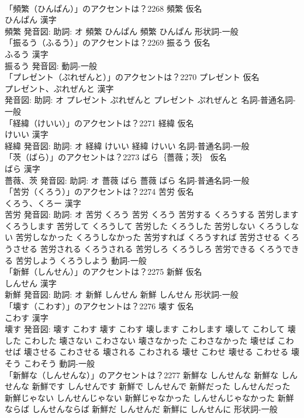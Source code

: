 \documentclass[8pt]{extreport}
\begin{document}
\begin{CJK}{UTF8}{min}
\\	「頻繁（ひんぱん）」のアクセントは？2268	頻繁 仮名　
\\	ひんぱん 漢字　
\\	頻繁 発音図: 助詞: オ	頻繁 ひんぱん		頻繁 ひんぱん				形状詞-一般 
\\	「振るう（ふるう）」のアクセントは？2269	振るう 仮名　
\\	ふるう 漢字　
\\	振るう 発音図:							動詞-一般 
\\	「プレゼント（ぷれぜんと）」のアクセントは？2270	プレゼント 仮名　
\\	プレゼント、ぷれぜんと 漢字　
\\	発音図: 助詞: オ	プレゼント ぷれぜんと		プレゼント ぷれぜんと				名詞-普通名詞-一般 
\\	「経緯（けいい）」のアクセントは？2271	経緯 仮名　
\\	けいい 漢字　
\\	経緯 発音図: 助詞: オ	経緯 けいい		経緯 けいい				名詞-普通名詞-一般 
\\	「茨（ばら）」のアクセントは？2273	ばら｛薔薇；茨｝ 仮名　
\\	ばら 漢字　
\\	薔薇、茨 発音図: 助詞: オ	薔薇 ばら		薔薇 ばら				名詞-普通名詞-一般 
\\	「苦労（くろう）」のアクセントは？2274	苦労 仮名　
\\	くろう、くろー 漢字　
\\	苦労 発音図: 助詞: オ	苦労 くろう		苦労 くろう 苦労する くろうする 苦労します くろうします 苦労して くろうして 苦労した くろうした 苦労しない くろうしない 苦労しなかった くろうしなかった 苦労すれば くろうすれば 苦労させる くろうさせる 苦労される くろうされる 苦労しろ くろうしろ 苦労できる くろうできる 苦労しよう くろうしよう				動詞-一般 
\\	「新鮮（しんせん）」のアクセントは？2275	新鮮 仮名　
\\	しんせん 漢字　
\\	新鮮 発音図: 助詞: オ	新鮮 しんせん		新鮮 しんせん				形状詞-一般 
\\	「壊す（こわす）」のアクセントは？2276	壊す 仮名　
\\	こわす 漢字　
\\	壊す 発音図:	壊す こわす		壊す こわす 壊します こわします 壊して こわして 壊した こわした 壊さない こわさない 壊さなかった こわさなかった 壊せば こわせば 壊させる こわさせる 壊される こわされる 壊せ こわせ 壊せる こわせる 壊そう こわそう				動詞-一般 
\\	「新鮮な（しんせんな）」のアクセントは？2277		新鮮な しんせんな		新鮮な しんせんな 新鮮です しんせんです 新鮮で しんせんで 新鮮だった しんせんだった 新鮮じゃない しんせんじゃない 新鮮じゃなかった しんせんじゃなかった 新鮮ならば しんせんならば 新鮮だ しんせんだ 新鮮に しんせんに				形状詞-一般 

\end{CJK}
\end{document}
